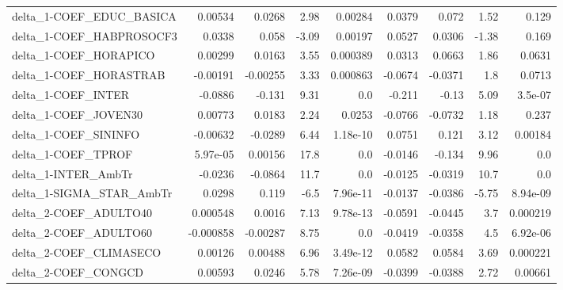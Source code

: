 \begin{tabular}{lrrrrrrrr}
delta\_1-COEF\_EDUC\_BASICA          &     0.00534 &       0.0268 &    2.98 &  0.00284 &     0.0379 &       0.072 &         1.52 &         0.129 \\
delta\_1-COEF\_HABPROSOCF3          &      0.0338 &        0.058 &   -3.09 &  0.00197 &     0.0527 &      0.0306 &        -1.38 &         0.169 \\
delta\_1-COEF\_HORAPICO             &     0.00299 &       0.0163 &    3.55 & 0.000389 &     0.0313 &      0.0663 &         1.86 &        0.0631 \\
delta\_1-COEF\_HORASTRAB            &    -0.00191 &     -0.00255 &    3.33 & 0.000863 &    -0.0674 &     -0.0371 &          1.8 &        0.0713 \\
delta\_1-COEF\_INTER                &     -0.0886 &       -0.131 &    9.31 &      0.0 &     -0.211 &       -0.13 &         5.09 &       3.5e-07 \\
delta\_1-COEF\_JOVEN30              &     0.00773 &       0.0183 &    2.24 &   0.0253 &    -0.0766 &     -0.0732 &         1.18 &         0.237 \\
delta\_1-COEF\_SININFO              &    -0.00632 &      -0.0289 &    6.44 & 1.18e-10 &     0.0751 &       0.121 &         3.12 &       0.00184 \\
delta\_1-COEF\_TPROF                &    5.97e-05 &      0.00156 &    17.8 &      0.0 &    -0.0146 &      -0.134 &         9.96 &           0.0 \\
delta\_1-INTER\_AmbTr               &     -0.0236 &      -0.0864 &    11.7 &      0.0 &    -0.0125 &     -0.0319 &         10.7 &           0.0 \\
delta\_1-SIGMA\_STAR\_AmbTr          &      0.0298 &        0.119 &    -6.5 & 7.96e-11 &    -0.0137 &     -0.0386 &        -5.75 &      8.94e-09 \\
delta\_2-COEF\_ADULTO40             &    0.000548 &       0.0016 &    7.13 & 9.78e-13 &    -0.0591 &     -0.0445 &          3.7 &      0.000219 \\
delta\_2-COEF\_ADULTO60             &   -0.000858 &     -0.00287 &    8.75 &      0.0 &    -0.0419 &     -0.0358 &          4.5 &      6.92e-06 \\
delta\_2-COEF\_CLIMASECO            &     0.00126 &      0.00488 &    6.96 & 3.49e-12 &     0.0582 &      0.0584 &         3.69 &      0.000221 \\
delta\_2-COEF\_CONGCD               &     0.00593 &       0.0246 &    5.78 & 7.26e-09 &    -0.0399 &     -0.0388 &         2.72 &       0.00661 \\

\end{tabular}
